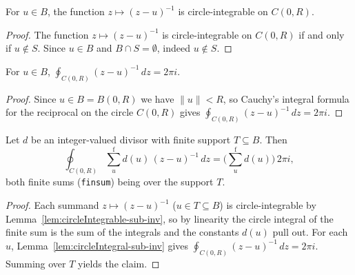 \begin{lemma}
    \label{lem:circleIntegrable-sub-inv}
    \leanok
    For $u \in B$, the function $z \mapsto (z-u)^{-1}$ is circle-integrable on
    $C(0,R)$.
\end{lemma}
\begin{proof}
    The function $z \mapsto (z-u)^{-1}$ is circle-integrable on $C(0,R)$ if and
    only if $u \notin S$. Since $u \in B$ and $B \cap S = \emptyset$, indeed
    $u \notin S$.
\end{proof}

\begin{lemma}
    \label{lem:circleIntegral-sub-inv}
    \leanok
    For $u \in B$,
    $\oint_{C(0,R)} (z-u)^{-1}\,dz = 2\pi i$.
\end{lemma}
\begin{proof}
    Since $u \in B = B(0,R)$ we have $\|u\| < R$, so Cauchy's integral formula for
    the reciprocal on the circle $C(0,R)$ gives
    $\oint_{C(0,R)} (z-u)^{-1}\,dz = 2\pi i$.
\end{proof}

\begin{lemma}
    \label{lem:circleIntegral-sum-inv}
    \leanok
    Let $d$ be an integer-valued divisor with finite support $T \subseteq B$.
    Then
    \[
        \oint_{C(0,R)}
          \operatorname*{{\textstyle\sum}^{\mathrm f}}_{u} d(u)\,(z-u)^{-1}\,dz
            = \Big(\operatorname*{{\textstyle\sum}^{\mathrm f}}_{u} d(u)\Big)\,
              2\pi i,
    \]
    both finite sums (\texttt{finsum}) being over the support $T$.
\end{lemma}
\begin{proof}
    Each summand $z \mapsto (z-u)^{-1}$ ($u \in T \subseteq B$) is
    circle-integrable by Lemma~\ref{lem:circleIntegrable-sub-inv}, so by linearity
    the circle integral of the finite sum is the sum of the integrals and the
    constants $d(u)$ pull out. For each $u$, Lemma~\ref{lem:circleIntegral-sub-inv}
    gives $\oint_{C(0,R)} (z-u)^{-1}\,dz = 2\pi i$. Summing over $T$ yields the
    claim.
\end{proof}

